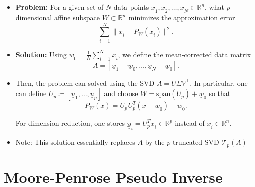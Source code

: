 \documentclass[11pt,twoside]{report}
\newcommand{\vecnot}{\underline}
\begin{document}
\begin{itemize}
\item  \textbf{Problem:} For a given set of $N$ data points $\vecnot x_{1},\vecnot x_{2},\ldots,\vecnot x_{N}\in\mathbb{R}^{n}$, what $p$-dimensional affine subspace $W\subset\mathbb{R}^{n}$ minimizes the approximation error 
\[
\sum_{i=1}^{N}\|\vecnot x_{i}-P_{W}(\vecnot x_{i})\|^{2}.
\]

\item 
\textbf{Solution:} Using $\vecnot w_{0}=\frac{1}{N}\sum_{i=1}^{N}\vecnot x_{i}$, we define the mean-corrected data matrix \vspace{-1.5mm}
\[ A=[\vecnot x_{1}-\vecnot w_{0},\ldots,\vecnot x_{N}-\vecnot w_{0}]. \]



\item 
Then, the problem can solved using the SVD $A=U\Sigma V^\top$.  In particular, one can define $U_{p} \coloneqq [\vecnot u_{1},\ldots,\vecnot u_{p}]$ and choose $W = \textrm{span}(U_p) + \vecnot{w}_0$ so that 
\[ P_{W}(\vecnot x)=U_{p}U_{p}^{T}(\vecnot x-\vecnot w_{0})+\vecnot w_{0} . \]

\vspace{-1mm}

For dimension reduction, one stores $\vecnot y_{i}=U_{p}^{T}\vecnot x_{i}\in\mathbb{R}^{p}$ instead of $\vecnot x_{i}\in\mathbb{R}^{n}$.



\item Note: This solution essentially replaces $A$ by the $p$-truncated SVD $\mathcal{T}_p (A)$

\end{itemize}

\section{Moore-Penrose Pseudo Inverse}
\end{document}
